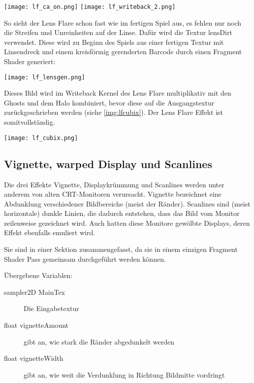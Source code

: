 \captionsetup{type=figure}
\texttt{[image: lf\_ca\_on.png]}
\texttt{[image: lf\_writeback\_2.png]}

So sieht der Lens Flare schon fast wie im fertigen Spiel aus, es fehlen nur noch die Streifen und Unreinheiten auf der Linse. Dafür wird die Textur lensDirt verwendet. Diese wird zu Beginn des Spiels aus einer fertigen Textur mit Linsendreck und einem kreisförmig gerenderten Barcode durch einen Fragment Shader generiert:

\captionsetup{type=figure}
\texttt{[image: lf\_lensgen.png]}

Dieses Bild wird im Writeback Kernel des Lens Flare multiplikativ mit den Ghosts und dem Halo kombiniert, bevor diese auf die Ausgangstextur zurückgeschrieben werden (siehe \autoref{img:lfcubix}). Der Lens Flare Effekt ist somitvollständig.

\captionsetup{type=figure}
\texttt{[image: lf\_cubix.png]}
\label{img:lfcubix}



\subsection{Vignette, warped Display und Scanlines}

Die drei Effekte Vignette, Displaykrümmung und Scanlines werden unter anderem von alten CRT-Monitoren verursacht. Vignette bezeichnet eine Abdunklung verschiedener Bildbereiche (meist der Ränder). Scanlines sind (meist horizontale) dunkle Linien, die dadurch entstehen, dass das Bild vom Monitor zeilenweise gezeichnet wird. Auch hatten diese Monitore gewölbte Displays, deren Effekt ebenfalls emuliert wird.

Sie sind in einer Sektion zusammengefasst, da sie in einem einzigen Fragment Shader Pass gemeinsam durchgeführt werden können.

Übergebene Variablen:
\begin{description}
\item[sampler2D MainTex] Die Eingabetextur
\item[float vignetteAmount] gibt an, wie stark die Ränder abgedunkelt werden
\item[float vignetteWidth] gibt an, wie weit die Verdunklung in Richtung Bildmitte vordringt
\end{description}

